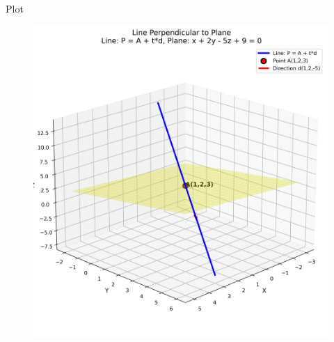 \documentclass{beamer}
\begin{document}
\begin{frame}{Plot}
\begin{figure}[H]
	\centering
	\includegraphics[width=0.8\linewidth]{figs/line_perpendicular}
	\caption{}
	\label{fig:lineperpendicular}
\end{figure}

\end{frame}
\end{document}
